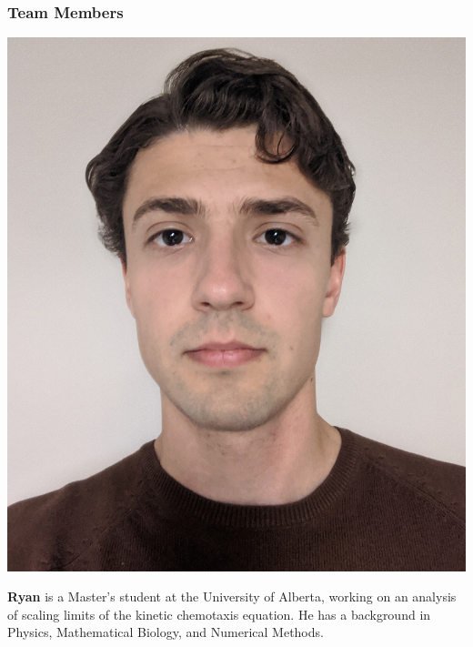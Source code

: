 \documentclass{beamer}
\begin{document}
\begin{frame}
\frametitle{Team Members}


\begin{minipage}[c]{0.15\textwidth}
\includegraphics[width=\textwidth, trim={70pt 170pt 70pt 100pt}, clip]{TeamPics/ryan.jpg}
\end{minipage}\hspace{0.05\textwidth}%
\begin{minipage}[c]{0.8\textwidth}
{\small \textbf{Ryan} is a Master’s student at the University of Alberta, working on an analysis of scaling limits of the kinetic chemotaxis equation. He has a background in Physics, Mathematical Biology, and Numerical Methods.}
\end{minipage}



\end{frame}
\end{document}
